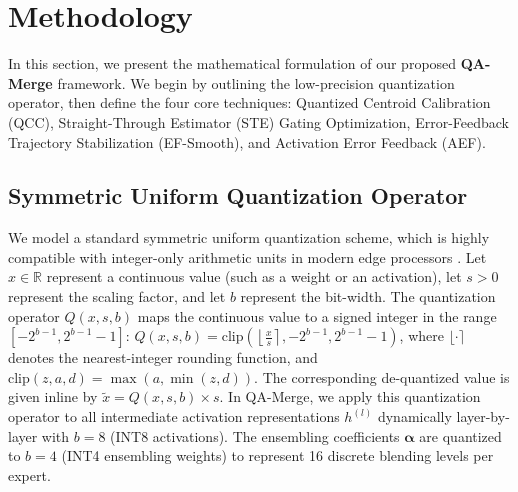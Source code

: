 \section{Methodology}
\label{sec:method}

In this section, we present the mathematical formulation of our proposed \textbf{QA-Merge} framework. We begin by outlining the low-precision quantization operator, then define the four core techniques: Quantized Centroid Calibration (QCC), Straight-Through Estimator (STE) Gating Optimization, Error-Feedback Trajectory Stabilization (EF-Smooth), and Activation Error Feedback (AEF).

\subsection{Symmetric Uniform Quantization Operator}
We model a standard symmetric uniform quantization scheme, which is highly compatible with integer-only arithmetic units in modern edge processors \cite{jacob2018quantization}. Let $x \in \mathbb{R}$ represent a continuous value (such as a weight or an activation), let $s > 0$ represent the scaling factor, and let $b$ represent the bit-width. The quantization operator $Q(x, s, b)$ maps the continuous value to a signed integer in the range $[-2^{b-1}, 2^{b-1}-1]$: $Q(x, s, b) = \text{clip}\left( \left\lfloor \frac{x}{s} \right\rceil, -2^{b-1}, 2^{b-1}-1 \right)$, where $\lfloor \cdot \rceil$ denotes the nearest-integer rounding function, and $\text{clip}(z, a, d) = \max(a, \min(z, d))$. The corresponding de-quantized value is given inline by $\tilde{x} = Q(x, s, b) \times s$.
In QA-Merge, we apply this quantization operator to all intermediate activation representations $h^{(l)}$ dynamically layer-by-layer with $b=8$ (INT8 activations). The ensembling coefficients $\boldsymbol{\alpha}$ are quantized to $b=4$ (INT4 ensembling weights) to represent 16 discrete blending levels per expert.

